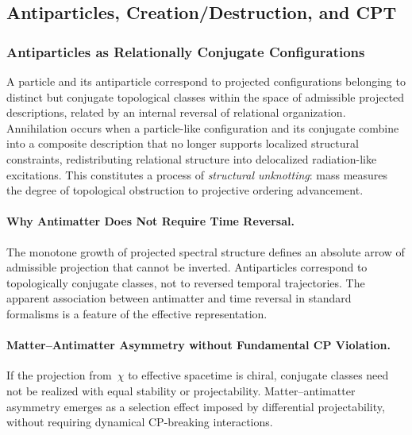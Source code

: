 \subsection{Antiparticles, Creation/Destruction, and CPT}
  \label{subsec:antiparticles}

  \subsubsection*{Antiparticles as Relationally Conjugate Configurations}

    A particle and its antiparticle correspond to projected configurations
    belonging to distinct but conjugate topological classes within the space
    of admissible projected descriptions, related by an internal reversal of
    relational organization.
    Annihilation occurs when a particle-like configuration and its conjugate
    combine into a composite description that no longer supports localized
    structural constraints, redistributing relational structure into
    delocalized radiation-like excitations.
    This constitutes a process of \emph{structural unknotting}: mass measures
    the degree of topological obstruction to projective ordering advancement.

    \paragraph{Why Antimatter Does Not Require Time Reversal.}
      \label{subsec:why-antimatter-no-time-reversal}
      The monotone growth of projected spectral structure defines an absolute
      arrow of admissible projection that cannot be inverted.
      Antiparticles correspond to topologically conjugate classes, not to
      reversed temporal trajectories.
      The apparent association between antimatter and time reversal in standard
      formalisms is a feature of the effective representation.

    \paragraph{Matter--Antimatter Asymmetry without Fundamental CP Violation.}
      \label{subsec:matter-antimatter-asymmetry-without-cp}
      If the projection from~$\chi$ to effective spacetime is chiral, conjugate
      classes need not be realized with equal stability or projectability.
      Matter--antimatter asymmetry emerges as a selection effect imposed by
      differential projectability, without requiring dynamical CP-breaking
      interactions.

